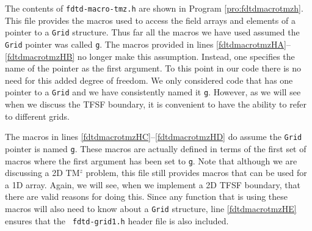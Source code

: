 The contents of {\tt fdtd-macro-tmz.h} are shown in Program
\ref{pro:fdtdmacrotmzh}.  This file provides the macros used to access
the field arrays and elements of a pointer to a {\tt Grid} structure.
Thus far all the macros we have used assumed the {\tt Grid} pointer
was called {\tt g}.  The macros provided in lines
\ref{fdtdmacrotmzHA}--\ref{fdtdmacrotmzHB} no longer make this
assumption.  Instead, one specifies the name of the pointer as the
first argument.  To this point in our code there is no need for this
added degree of freedom.  We only considered code that has one pointer
to a {\tt Grid} and we have consistently named it {\tt g}.  However,
as we will see when we discuss the TFSF boundary, it is convenient to
have the ability to refer to different grids.

The macros in lines \ref{fdtdmacrotmzHC}--\ref{fdtdmacrotmzHD} do
assume the {\tt Grid} pointer is named {\tt g}.  These macros are
actually defined in terms of the first set of macros where the first
argument has been set to {\tt g}.  Note that although we are
discussing a 2D TM$^z$ problem, this file still provides macros that
can be used for a 1D array.  Again, we will see, when we implement a
2D TFSF boundary, that there are valid reasons for doing this.  Since
any function that is using these macros will also need to know about a
{\tt Grid} structure, line \ref{fdtdmacrotmzHE} ensures that the {\tt
  fdtd-grid1.h} header file is also included.

